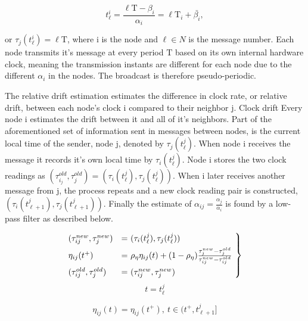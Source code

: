 \documentclass[a4paper,12pt]{article}
\begin{document}
    \begin{equation}
        t^i_\ell = \frac{\ell\mathrm{T} - \beta_i}{\alpha_i} = \ell\mathrm{T}_i + \bar{\beta_i},
    \end{equation}
    
    or $\tau_j(t^i_\ell) = \ell\mathrm{T}$, where i is the node and $\ell \in N$ is the message number. Each node transmits it's message at every period $\mathrm{T}$ based on its own internal hardware clock, meaning the transmission instants are different for each node due to the different $\alpha_i$ in the nodes. The broadcast is therefore pseudo-periodic.
    
    
    The relative drift estimation estimates the difference in clock rate, or relative drift, between each node's clock i compared to their neighbor j. Clock drift  Every node i estimates the drift between it and all of it's neighbors. Part of the aforementioned set of information sent in messages between nodes, is the current local time of the sender, node j, denoted by $\tau_j(t^j_\ell)$. When node i receives the message it records it's own local time by $\tau_i(t^j_\ell)$. Node i stores the two clock readings as $(\tau^{old}_{i_j}, \tau^{old}_j) = (\tau_i(t^j_\ell), \tau_j(t^j_\ell))$. 
    When i later receives another message from j, the process repeats and a new clock reading pair is constructed, $(\tau_i(t^j_{\ell + 1}), \tau_j(t^j_{\ell + 1}))$. Finally the estimate of $\alpha_{ij} = \frac{\alpha_j}{\alpha_i}$ is found by a low-pass filter as described below.
    
    \begin{equation}
        \begin{rcases*}
            (\tau_{ij}^{new}, \tau_j^{new}) &= $(\tau_i(t^j_\ell), \tau_j(t^j_\ell))$ \\
            \eta_{ij}(t^+) &= $\rho_\eta\eta_{ij}(t) + (1 - \rho_\eta)\frac{\tau_j^{new} - \tau_j^{old}}{\tau_{ij}^{new} - \tau_{ij}^{old}} $ \\
            (\tau_{ij}^{old}, \tau_j^{old}) &= $(\tau_{ij}^{new}, \tau_j^{new})$
        \end{rcases*} \nonumber
    \end{equation}
    \begin{equation}
        t = t^j_\ell
    \end{equation}
    
    \begin{equation}
        \eta_{ij}(t) = \eta_{ij}(t^+),\ t \in (t^+, t_{\ell + 1}^j]
    \end{equation}
    
\end{document}
